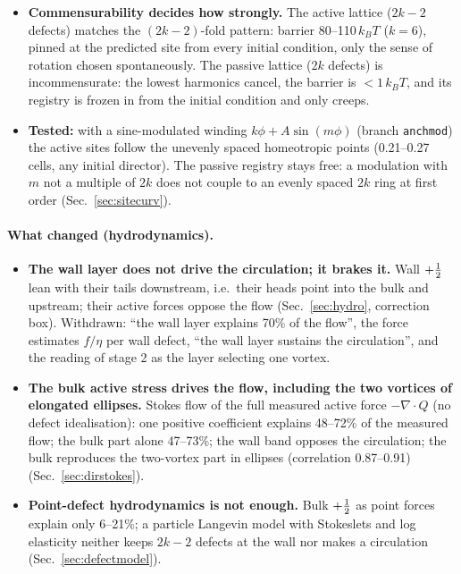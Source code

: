 \begin{itemize}
        Measured ($k=6$): $+41^\circ,-20^\circ,-91^\circ,\dots$, steps of $-60^\circ=-2\pi/6$ (Sec.~\ref{sec:fluct}). The passive ring is therefore frustrated:
        most of its defects are tilted whatever the registry, which is why the registry energy averages out (incommensurate, $<1\,k_BT$).
        \emph{Interpretation:} the active state ejects exactly two $+\half$ into the bulk; the remaining $2k-2$ are the largest commensurate ring, which can
        sit untilted on the homeotropic points, so the $+1$ bulk also relieves the tilt frustration of the wall.
  \item \textbf{Commensurability decides how strongly.} The active lattice ($2k-2$ defects) matches the $(2k-2)$-fold pattern: barrier 80--110\,$k_BT$ ($k=6$),
        pinned at the predicted site from every initial condition, only the sense of rotation chosen spontaneously. The passive lattice ($2k$ defects) is
        incommensurate: the lowest harmonics cancel, the barrier is $<1\,k_BT$, and its registry is frozen in from the initial condition and only creeps.
  \item \textbf{Tested:} with a sine-modulated winding $k\phi+A\sin(m\phi)$ (branch \texttt{anchmod}) the active sites follow the unevenly spaced homeotropic points
        (0.21--0.27 cells, any initial director). The passive registry stays free: a modulation with $m$ not a multiple of $2k$ does not couple to an evenly spaced
        $2k$ ring at first order (Sec.~\ref{sec:sitecurv}).
\end{itemize}

\paragraph{What changed (hydrodynamics).}
\begin{itemize}
  \item \textbf{The wall layer does not drive the circulation; it brakes it.} Wall $+\half$ lean with their tails downstream, i.e.\ their heads point into the bulk and
        upstream; their active forces oppose the flow (Sec.~\ref{sec:hydro}, correction box). Withdrawn: ``the wall layer explains 70\% of the flow'', the force
        estimates $f/\eta$ per wall defect, ``the wall layer sustains the circulation'', and the reading of stage 2 as the layer selecting one vortex.
  \item \textbf{The bulk active stress drives the flow, including the two vortices of elongated ellipses.} Stokes flow of the full measured active force
        $-\nabla\!\cdot Q$ (no defect idealisation): one positive coefficient explains 48--72\% of the measured flow; the bulk part alone 47--73\%; the wall band
        opposes the circulation; the bulk reproduces the two-vortex part in ellipses (correlation 0.87--0.91) (Sec.~\ref{sec:dirstokes}).
  \item \textbf{Point-defect hydrodynamics is not enough.} Bulk $+\half$ as point forces explain only 6--21\%; a particle Langevin model with Stokeslets and log
        elasticity neither keeps $2k-2$ defects at the wall nor makes a circulation (Sec.~\ref{sec:defectmodel}).
\end{itemize}

